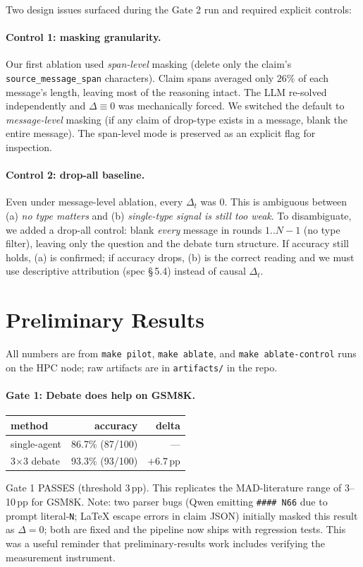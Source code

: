 \begin{itemize}
Two design issues surfaced during the Gate 2 run and required explicit controls:

\paragraph{Control 1: masking granularity.} Our first ablation used \textit{span-level} masking (delete only the claim's \texttt{source\_message\_span} characters). Claim spans averaged only $26\%$ of each message's length, leaving most of the reasoning intact. The LLM re-solved independently and $\Delta \equiv 0$ was mechanically forced. We switched the default to \textit{message-level} masking (if any claim of drop-type exists in a message, blank the entire message). The span-level mode is preserved as an explicit flag for inspection.

\paragraph{Control 2: drop-all baseline.} Even under message-level ablation, every $\Delta_t$ was $0$. This is ambiguous between (a) \textit{no type matters} and (b) \textit{single-type signal is still too weak}. To disambiguate, we added a drop-all control: blank \textit{every} message in rounds $1..N{-}1$ (no type filter), leaving only the question and the debate turn structure. If accuracy still holds, (a) is confirmed; if accuracy drops, (b) is the correct reading and we must use descriptive attribution (spec \S\,5.4) instead of causal $\Delta_t$.

\section*{Preliminary Results}

All numbers are from \texttt{make pilot}, \texttt{make ablate}, and \texttt{make ablate-control} runs on the HPC node; raw artifacts are in \texttt{artifacts/} in the repo.

\paragraph{Gate 1: Debate does help on GSM8K.}
\begin{center}
\begin{tabular}{lrr}
\toprule
method & accuracy & delta \\
\midrule
single-agent & 86.7\% (87/100) & --- \\
3$\times$3 debate & 93.3\% (93/100) & $+6.7$\,pp \\
\bottomrule
\end{tabular}
\end{center}
Gate 1 PASSES (threshold 3\,pp). This replicates the MAD-literature range of 3--10\,pp for GSM8K. Note: two parser bugs (Qwen emitting \texttt{\#\#\#\# N66} due to prompt literal-\texttt{N}; LaTeX escape errors in claim JSON) initially masked this result as $\Delta=0$; both are fixed and the pipeline now ships with regression tests. This was a useful reminder that preliminary-results work includes verifying the measurement instrument.


\end{itemize}
